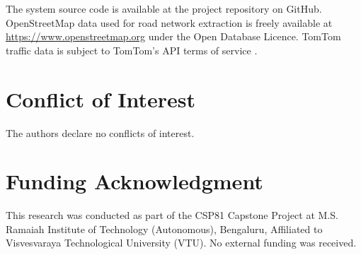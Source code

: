 \documentclass[journal]{IEEEtran}
\begin{document}
The system source code is available at the project repository on GitHub. OpenStreetMap data
used for road network extraction is freely available at \url{https://www.openstreetmap.org}
\cite{osm2017} under the Open Database Licence. TomTom traffic data is subject to TomTom's
API terms of service \cite{tomtom2024}.

\section*{Conflict of Interest}

The authors declare no conflicts of interest.

\section*{Funding Acknowledgment}

This research was conducted as part of the CSP81 Capstone Project at M.S. Ramaiah Institute
of Technology (Autonomous), Bengaluru, Affiliated to Visvesvaraya Technological University
(VTU). No external funding was received.



\end{document}
